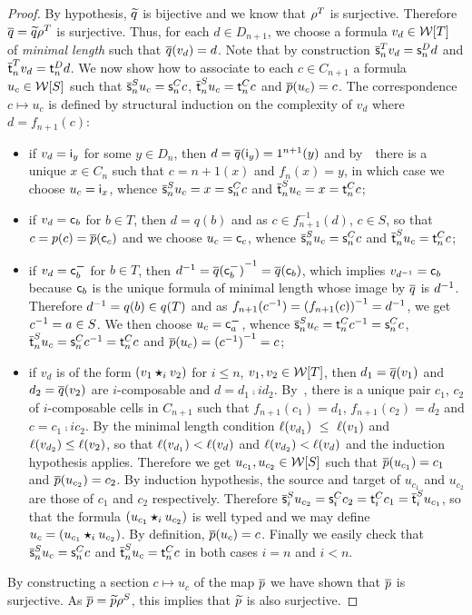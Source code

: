\begin{proof}
  By hypothesis, $\widetilde{q}$ is bijective and we know that $\rho^{T}$ is
surjective. Therefore $\overline{q}=\widetilde{q}\rho^{T}$ is surjective.  Thus,
for each $d\in D_{n+1}$, we choose a formula  $v_d\in \mathcal{W}[T]$ of
{\em minimal length} such
that $\overline{q}(v_d)=d$. Note that by construction $\overline{\mathsf{s}}_{n}^Tv_d=\mathsf{s}_{n}^D d$ and $\overline{\mathsf{t}}_{n}^Tv_d=\mathsf{t}_{n}^D d$.
We now show how to associate to each $c\in C_{n+1}$ a formula
$u_c\in\mathcal{W}[S]$ such that $\overline{\mathsf{s}}_{n}^S u_c=\mathsf{s}_{n}^C c$, $\overline{\mathsf{t}}_{n}^S u_c=\mathsf{t}_{n}^C c$ and $\overline{p}(u_c)=c$. The
correspondence $c\mapsto u_c$ is defined by structural induction on
the complexity of $v_d$ where $d=f_{n+1}(c)$:
\begin{itemize}
\item if $v_d=\mathsf{i}_{y}$ for some $y\in D_n$, then $d=\overline{q}(\mathsf{i}_{y})=1^{n+1}(y)$ and by~\cndi\
  there is a unique $x\in C_n$ such that $c=\unit{n+1}(x)$ and $f_n(x)=y$, in
  which case we choose  $u_c=\mathsf{i}_{x}$, whence $\overline{\mathsf{s}}_{n}^Su_c=x=\mathsf{s}_{n}^Cc$
  and $\overline{\mathsf{t}}_{n}^Su_c=x=\mathsf{t}_{n}^Cc$;   
\item if $v_d=\mathsf{c}_{b}$ for $b\in T$, then $d=q(b)$ and as  $c\in
  f_{n+1}^{-1}(d)$, $c\in S$, so that $c=p(c)=\overline{p}(\mathsf{c}_{c})$ and we
  choose $u_c=\mathsf{c}_{c}$, whence $\overline{\mathsf{s}}_{n}^Su_c=\mathsf{s}_{n}^Cc$
  and $\overline{\mathsf{t}}_{n}^Su_c=\mathsf{t}_{n}^Cc$; 
 \item if $v_d=\mathsf{c}^{\boldsymbol{-}}_{b}$ for $b\in T$, then ${d}^{-1}={\overline{q}(\mathsf{c}^{\boldsymbol{-}}_{b})}^{-1}=\overline{q}(\mathsf{c}_{b})$, which
   implies $v_{{d}^{-1}}=\mathsf{c}_{b}$ because $\mathsf{c}_{b}$ is the unique
   formula of minimal length whose image by $\overline{q}$ is ${d}^{-1}$. Therefore ${d}^{-1}=q(b)\in q(T)$ and as $f_{n+1}({c}^{-1})={(f_{n+1}(c))}^{-1}={d}^{-1}$, we get ${c}^{-1}=a\in S$. We then
   choose $u_c=\mathsf{c}^{\boldsymbol{-}}_{a}$, whence
   $\overline{\mathsf{s}}_{n}^Su_c=\mathsf{t}_{n}^C{c}^{-1}=\mathsf{s}_{n}^Cc$,
   $\overline{\mathsf{t}}_{n}^Su_c=\mathsf{s}_{n}^C{c}^{-1}=\mathsf{t}_{n}^Cc$ and $\overline{p}(u_c)={({c}^{-1})}^{-1}=c$;
 \item if $v_d$ is of the form $(v_1\bm{\star}_{i} v_2)$ for $i\leq n$,
   $v_1,v_2\in \mathcal{W}[T]$, then $d_1=\overline{q}(v_1)$ and $d_2=\overline{q}
   (v_2)$ are $i$-composable and $d=d_1\comp i d_2$. By~\cndii, there is a unique pair $c_1$, $c_2$ of
   $i$-composable cells in $C_{n+1}$ such that $f_{n+1}(c_1)=d_1$,
   $f_{n+1}(c_2)=d_2$ and $c=c_1\comp i c_2$. 
By the minimal length condition $\ell(v_{d_1})~\leq~\ell(v_1) $ and $\ell(v_{d_2})\leq \ell(v_2)$, so that
   $\ell(v_{d_1})<\ell(v_d)$ and $\ell(v_{d_2})<\ell(v_d)$ and the
   induction hypothesis applies. Therefore we get
   $u_{c_1},u_{c_2}\in\mathcal{W}[S]$ such that $\overline{p}(u_{c_1})=c_1$ and
   $\overline{p}(u_{c_2})=c_2$. By induction hypothesis, the source and
   target of $u_{c_1}$ and $u_{c_2}$ are those of $c_1$ and $c_2$
   respectively. Therefore $\overline{\mathsf{s}}_{i}^Su_{c_2}=\mathsf{s}_{i}^Cc_2=\mathsf{t}_{i}^Cc_1=\overline{\mathsf{t}}_{i}^Su_{c_1}$, so that the formula $(u_{c_1}\bm{\star}_{i}
   u_{c_2})$ is well typed and we may define $u_c=(u_{c_1}\bm{\star}_{i}
   u_{c_2})$. By definition, $\overline{p}(u_c)=c$. Finally we easily check
   that $\overline{\mathsf{s}}_{n}^Su_c=\mathsf{s}_{n}^Cc$ and $\overline{\mathsf{t}}_{n}^Su_c=\mathsf{t}_{n}^C c$ in both
   cases $i=n$ and $i<n$. 
 \end{itemize}
 By constructing a section $c\mapsto u_c$ of the map $\overline{p}$ we
 have shown that $\overline{p}$ is surjective. As $\overline{p}=\widetilde{p}\rho^{S}$, this implies that $\widetilde{p}$ is also surjective.
\end{proof}
